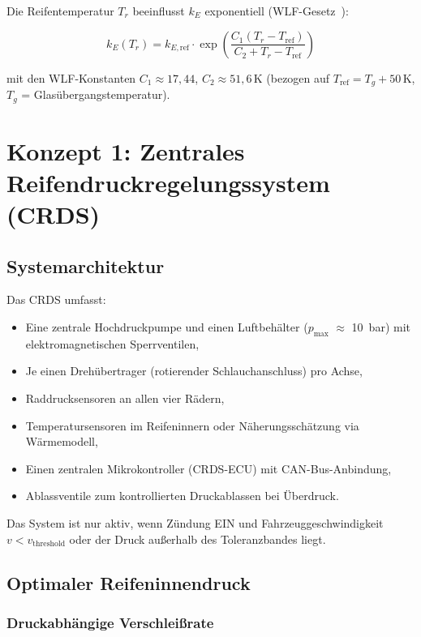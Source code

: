 ﻿\documentclass[12pt,a4paper]{article}
\theoremstyle{definition}
\theoremstyle{remark}
\begin{document}
Die Reifentemperatur $T_r$ beeinflusst $k_E$ exponentiell (WLF-Gesetz~\cite{Williams1955}):

\begin{equation}
  k_E(T_r) = k_{E,\mathrm{ref}}\cdot\exp\!\left(\frac{C_1(T_r - T_{\mathrm{ref}})}
    {C_2 + T_r - T_{\mathrm{ref}}}\right)
  \label{eq:wlf}
\end{equation}

mit den WLF-Konstanten $C_1 \approx 17{,}44$, $C_2 \approx 51{,}6$\,K
(bezogen auf $T_{\mathrm{ref}} = T_g + 50$\,K, $T_g$ = Glasübergangstemperatur).

\section{Konzept 1: Zentrales Reifendruckregelungssystem (CRDS)}
\label{sec:crds}

\subsection{Systemarchitektur}

Das CRDS umfasst:
\begin{itemize}
  \item Eine zentrale Hochdruckpumpe und einen Luftbehälter ($p_{\max}$
        $\approx$ \SI{10}{\bar}) mit elektromagnetischen Sperrventilen,
  \item Je einen Drehübertrager (rotierender Schlauchanschluss) pro Achse,
  \item Raddrucksensoren an allen vier Rädern,
  \item Temperatursensoren im Reifeninnern oder Näherungsschätzung via
        Wärmemodell,
  \item Einen zentralen Mikrokontroller (CRDS-ECU) mit CAN-Bus-Anbindung,
  \item Ablassventile zum kontrollierten Druckablassen bei Überdruck.
\end{itemize}

Das System ist nur aktiv, wenn Zündung EIN und Fahrzeuggeschwindigkeit
$v < v_{\mathrm{threshold}}$ oder der Druck außerhalb des Toleranzbandes liegt.

\subsection{Optimaler Reifeninnendruck}

\subsubsection{Druckabhängige Verschleißrate}
\end{document}
